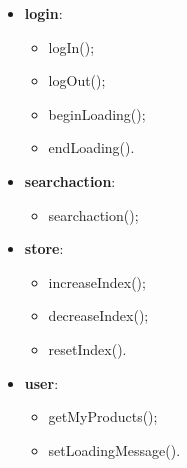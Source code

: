 \begin{itemize}
\begin{itemize}
	\end{itemize}
	\item \textbf{login}:
	\begin{itemize}
		\item logIn();
		\item logOut();
		\item beginLoading();
		\item endLoading().
	\end{itemize}
	\item \textbf{searchaction}:
	\begin{itemize}
		\item searchaction();
	\end{itemize}
	\item \textbf{store}:
	\begin{itemize}
		\item increaseIndex();
		\item decreaseIndex();
		\item resetIndex().
	\end{itemize}
	\item \textbf{user}:
	\begin{itemize}
		\item getMyProducts();
		\item setLoadingMessage().
	\end{itemize}
\end{itemize}

